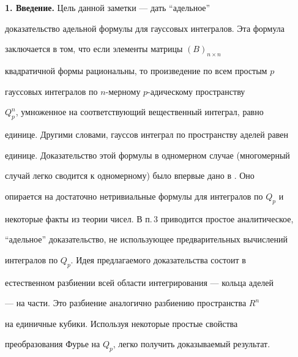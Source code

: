  


\date{} 




\pagestyle{plain} %


 




\maketitle 


\label{begin} 


 


{\bf 1. Введение.} Цель данной заметки --- дать ``адельное'' 


доказательство адельной формулы для гауссовых интегралов. Эта формула 


заключается в том, что если элементы матрицы $(B)_{n\times n}$ 


квадратичной формы рациональны, то произведение по всем простым $p$ 


гауссовых интегралов по $n$-мерному $p$-адическому пространству 


$Q^n_p$, умноженное на соответствующий вещественный интеграл, равно 


единице. Другими словами, гауссов интеграл по пространству аделей равен 


единице. Доказательство этой формулы в одномерном случае (многомерный 


случай легко сводится к одномерному) было впервые дано в \cite{1}. Оно 


опирается на достаточно нетривиальные формулы для интегралов по $Q_p$ и 


некоторые факты из теории чисел. В п.\,3 приводится простое аналитическое, 


``адельное'' доказательство, не использующее предварительных вычислений 


интегралов по $Q_p$. Идея предлагаемого доказательства состоит в 


естественном разбиении всей области интегрирования --- кольца аделей 


--- на части. Это разбиение аналогично разбиению пространства $R^n$


на единичные кубики. Используя некоторые простые свойства 


преобразования Фурье на $Q_p$, легко получить доказываемый результат. 


